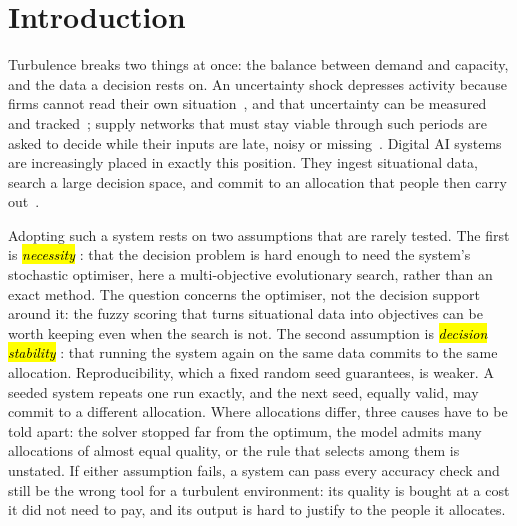 \documentclass[systems,article,accept,moreauthors,pdftex]{Definitions/mdpi}
\begin{document}
\section{Introduction}\label{sec:intro}

Turbulence breaks two things at once: the balance between demand and capacity, and the
data a decision rests on. An uncertainty shock depresses activity because firms cannot
read their own situation~\cite{bloom2009uncertainty}, and that uncertainty can be measured
and tracked~\cite{baker2016epu}; supply networks that must stay viable through such
periods are asked to decide while their inputs are late, noisy or missing~\cite{ivanov2020viability,ivanov2020covid}.
Digital AI systems are increasingly placed in exactly this position. They ingest
situational data, search a large decision space, and commit to an allocation that people
then carry out~\cite{modgil2022ai,belhadi2024ai,pan2025aiusage}.

Adopting such a system rests on two assumptions that are rarely tested. The first is
\emph{\hl{necessity}%
}: that the decision problem is hard enough to need the system's stochastic
optimiser, here a multi-objective evolutionary search, rather than an exact method. The
question concerns the optimiser, not the decision support around it: the fuzzy scoring that
turns situational data into objectives can be worth keeping even when the search is not. The
second assumption is \emph{\hl{decision stability}%
}: that running the system again on the same
data commits to the same allocation. Reproducibility, which a fixed random seed guarantees,
is weaker. A seeded system repeats one run exactly, and the next seed, equally valid, may
commit to a different allocation. Where allocations differ, three causes have to be told
apart: the solver stopped far from the optimum, the model admits many allocations of almost
equal quality, or the rule that selects among them is unstated. If either assumption fails, a
system can pass every accuracy check and still be the wrong tool for a turbulent environment:
its quality is bought at a cost it did not need to pay, and its output is hard to justify to
the people it allocates.
\end{document}
